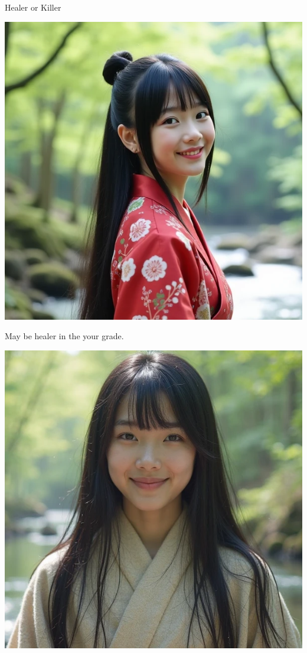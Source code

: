 \documentclass{beamer}
\begin{document}
\begin{frame}{Healer or Killer}
  \begin{minipage}{0.45\textwidth}
  \begin{center}
  \includegraphics[width=\textwidth]{heal.png}
  \end{center}
  \begin{center}
  May be healer in the your grade.
  \end{center}
  \end{minipage}
  \hfill
  \begin{minipage}{0.45\textwidth}
  \begin{center}
  \includegraphics[width=\textwidth]{kill.png}

\end{center}
\end{minipage}
\end{frame}
\end{document}
